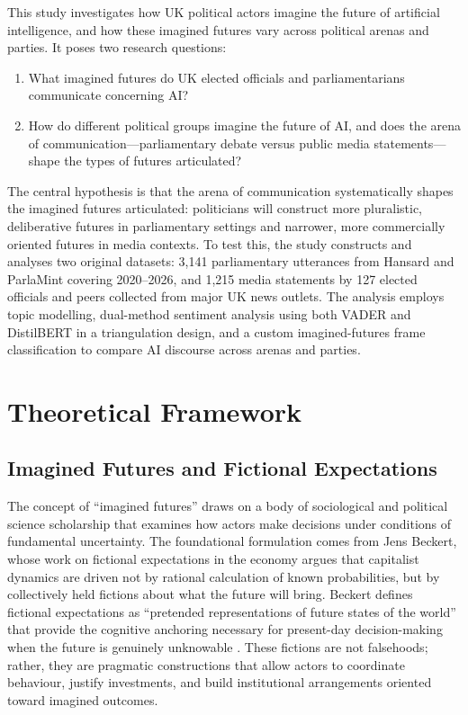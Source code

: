 This study investigates how UK political actors imagine the future of artificial intelligence, and how these imagined futures vary across political arenas and parties. It poses two research questions:

\begin{enumerate}
\item What imagined futures do UK elected officials and parliamentarians communicate concerning AI?
\item How do different political groups imagine the future of AI, and does the arena of communication---parliamentary debate versus public media statements---shape the types of futures articulated?
\end{enumerate}

The central hypothesis is that the arena of communication systematically shapes the imagined futures articulated: politicians will construct more pluralistic, deliberative futures in parliamentary settings and narrower, more commercially oriented futures in media contexts. To test this, the study constructs and analyses two original datasets: 3,141 parliamentary utterances from Hansard and ParlaMint covering 2020--2026, and 1,215 media statements by 127 elected officials and peers collected from major UK news outlets. The analysis employs topic modelling, dual-method sentiment analysis using both VADER and DistilBERT in a triangulation design, and a custom imagined-futures frame classification to compare AI discourse across arenas and parties.

\chapter{Theoretical Framework}

\section{Imagined Futures and Fictional Expectations}

The concept of ``imagined futures'' draws on a body of sociological and political science scholarship that examines how actors make decisions under conditions of fundamental uncertainty. The foundational formulation comes from Jens Beckert, whose work on fictional expectations in the economy argues that capitalist dynamics are driven not by rational calculation of known probabilities, but by collectively held fictions about what the future will bring. Beckert defines fictional expectations as ``pretended representations of future states of the world'' that provide the cognitive anchoring necessary for present-day decision-making when the future is genuinely unknowable \parencite[p.~222]{beckert2013}. These fictions are not falsehoods; rather, they are pragmatic constructions that allow actors to coordinate behaviour, justify investments, and build institutional arrangements oriented toward imagined outcomes.

